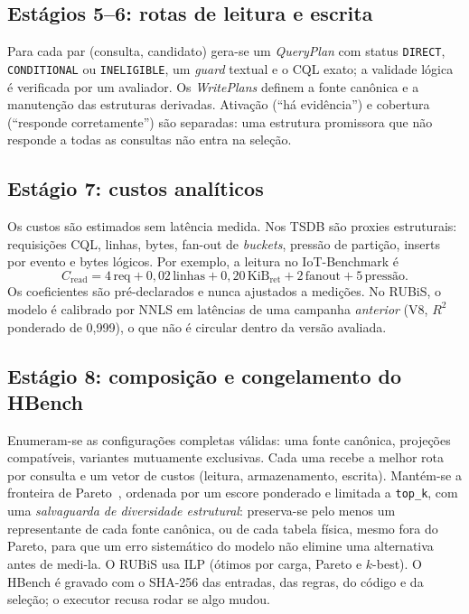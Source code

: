 \documentclass[10pt,a4paper,twoside]{article}
\theoremstyle{definition}\newtheorem{definicao}{Definição}
\begin{document}
\subsection{Estágios 5--6: rotas de leitura e escrita}
Para cada par (consulta, candidato) gera-se um \emph{QueryPlan} com status \texttt{DIRECT}, \texttt{CONDITIONAL} ou \texttt{INELIGIBLE}, um \emph{guard} textual e o CQL exato; a validade lógica é verificada por um avaliador. Os \emph{WritePlans} definem a fonte canônica e a manutenção das estruturas derivadas. Ativação (``há evidência'') e cobertura (``responde corretamente'') são separadas: uma estrutura promissora que não responde a todas as consultas não entra na seleção.

\subsection{Estágio 7: custos analíticos}
Os custos são estimados sem latência medida. Nos TSDB são proxies estruturais: requisições CQL, linhas, bytes, fan-out de \emph{buckets}, pressão de partição, inserts por evento e bytes lógicos. Por exemplo, a leitura no IoT-Benchmark é
\[
C_{\text{read}} = 4\,\text{req} + 0{,}02\,\text{linhas} + 0{,}20\,\text{KiB}_{\text{ret}} + 2\,\text{fanout} + 5\,\text{pressão}.
\]
Os coeficientes são pré-declarados e nunca ajustados a medições. No RUBiS, o modelo é calibrado por NNLS em latências de uma campanha \emph{anterior} (V8, $R^2$ ponderado de 0,999), o que não é circular dentro da versão avaliada.

\subsection{Estágio 8: composição e congelamento do HBench}
Enumeram-se as configurações completas válidas: uma fonte canônica, projeções compatíveis, variantes mutuamente exclusivas. Cada uma recebe a melhor rota por consulta e um vetor de custos (leitura, armazenamento, escrita). Mantém-se a fronteira de Pareto~\cite{ehrgott}, ordenada por um escore ponderado e limitada a \texttt{top\_k}, com uma \emph{salvaguarda de diversidade estrutural}: preserva-se pelo menos um representante de cada fonte canônica, ou de cada tabela física, mesmo fora do Pareto, para que um erro sistemático do modelo não elimine uma alternativa antes de medi-la. O RUBiS usa ILP (ótimos por carga, Pareto e $k$-best). O HBench é gravado com o SHA-256 das entradas, das regras, do código e da seleção; o executor recusa rodar se algo mudou.
\end{document}
